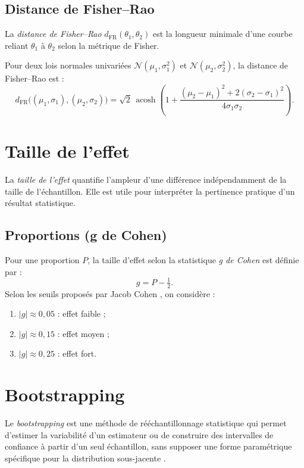 \subsection{Distance de Fisher–Rao}
La \emph{distance de Fisher–Rao} $d_{\mathrm{FR}}(\theta_1,\theta_2)$ est la longueur minimale d’une courbe reliant $\theta_1$ à $\theta_2$ selon la métrique de Fisher.

Pour deux lois normales univariées $\mathcal{N}(\mu_1, \sigma_1^2)$ et $\mathcal{N}(\mu_2, \sigma_2^2)$, la distance de Fisher–Rao est \citep{nielsen2023simple} :
\begin{equation}
	d_{\mathrm{FR}}\big((\mu_1,\sigma_1),(\mu_2,\sigma_2)\big)
	= \sqrt{2}\,\operatorname{acosh}\!\left(1 + \frac{(\mu_2 - \mu_1)^2 + 2(\sigma_2 - \sigma_1)^2}{4\sigma_1\sigma_2}\right).
	\label{eq:fr_normal}
\end{equation}

\section{Taille de l'effet}
La \emph{taille de l'effet} quantifie l'ampleur d'une différence indépendamment de la taille de l’échantillon. Elle est utile pour interpréter la pertinence pratique d’un résultat statistique.

\subsection{Proportions (g de Cohen)}
Pour une proportion $P$, la taille d’effet selon la statistique \emph{g de Cohen} est définie par :
\begin{equation}
	g = P - \tfrac{1}{2}.
\end{equation}
Selon les seuils proposés par Jacob Cohen \citep{cohen1992power}, on considère :
\begin{enumerate}
	\item $|g| \approx 0{,}05$ : effet faible ;
	\item $|g| \approx 0{,}15$ : effet moyen ;
	\item $|g| \approx 0{,}25$ : effet fort.
\end{enumerate}

\section{Bootstrapping}
Le \emph{bootstrapping} est une méthode de rééchantillonnage statistique qui permet d'estimer la variabilité d'un estimateur ou de construire des intervalles de confiance à partir d'un seul échantillon, sans supposer une forme paramétrique spécifique pour la distribution sous-jacente \citep{tibshirani1993introduction}.

